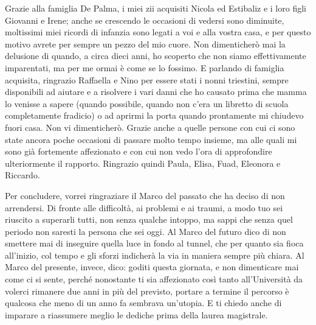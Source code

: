 \newline
Grazie alla famiglia De Palma, i miei zii acquisiti Nicola ed Estibaliz e i loro figli Giovanni e Irene; anche se crescendo le occasioni di vedersi sono diminuite, moltissimi miei ricordi di infanzia sono legati a voi e alla vostra casa, e per questo motivo avrete per sempre un pezzo del mio cuore. Non dimenticherò mai la delusione di quando, a circa dieci anni, ho scoperto che non siamo effettivamente imparentati, ma per me ormai è come se lo fossimo.
\newline
E parlando di famiglia acquisita, ringrazio Raffaella e Nino per essere stati i nonni triestini, sempre disponibili ad aiutare e a risolvere i vari danni che ho causato prima che mamma lo venisse a sapere (quando possibile, quando non c'era un libretto di scuola completamente fradicio) o ad aprirmi la porta quando prontamente mi chiudevo fuori casa. Non vi dimenticherò. 
\newline
Grazie anche a quelle persone con cui ci sono state ancora poche occasioni di passare molto tempo insieme, ma alle quali mi sono già fortemente affezionato e con cui non vedo l'ora di approfondire ulteriormente il rapporto. Ringrazio quindi Paula, Elisa, Fuad, Eleonora e Riccardo.


\vspace{2.5em}
\begingroup
\setlength{\parskip}{0pt}
Per concludere, vorrei ringraziare il Marco del passato che ha deciso di non arrendersi. 
\newline
Di fronte alle difficoltà, ai problemi e ai traumi, a modo tuo sei riuscito a superarli tutti, non senza qualche intoppo, ma sappi che senza quel periodo non saresti la persona che sei oggi. 
\newline
Al Marco del futuro dico di non smettere mai di inseguire quella luce in fondo al tunnel, che per quanto sia fioca all'inizio, col tempo e gli sforzi indicherà la via in maniera sempre più chiara.
\newline
Al Marco del presente, invece, dico: goditi questa giornata, e non dimenticare mai come ci si sente, perché nonostante ti sia affezionato così tanto all'Università da volerci rimanere due anni in più del previsto, portare a termine il percorso è qualcosa che meno di un anno fa sembrava un'utopia. 
\newline
E ti chiedo anche di imparare a riassumere meglio le dediche prima della laurea magistrale.\par
\endgroup